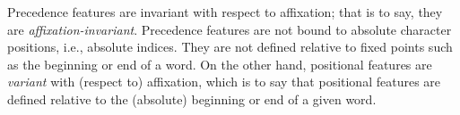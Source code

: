 Precedence features are invariant with respect to affixation; that is to say, 
they are 
\emph{affixation-invariant}.
Precedence features are not bound to absolute character positions, i.e., 
absolute indices. They are not defined relative to fixed points such as 
the beginning or end of a word.
On the other hand, positional features are \emph{variant} 
with (respect to) affixation, which is to say that positional features are 
defined relative to the (absolute) beginning 
or end of a given word. 
